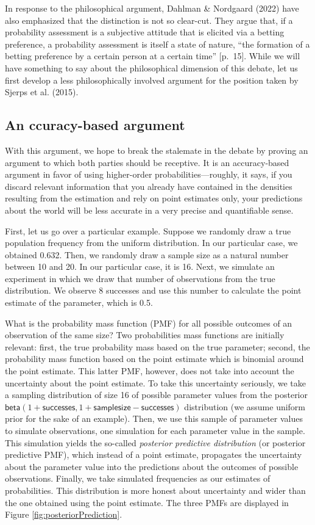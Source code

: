 \documentclass[
  10pt,
  dvipsnames,enabledeprecatedfontcommands]{scrartcl}
\newcommand{\s}[1]{\mbox{$\mathsf{#1}$}}
\begin{document}
In response to the philosophical argument, Dahlman \& Nordgaard (2022)
have also emphasized that the distinction is not so clear-cut. They
argue that, if a probability assessment is a subjective attitude that is
elicited via a betting preference, a probability assessment is itself a
state of nature, ``the formation of a betting preference by a certain
person at a certain time'' {[}p.~15{]}. While we will have something to
say about the philosophical dimension of this debate, let us first
develop a less philosophically involved argument for the position taken
by Sjerps et al. (2015).

\hypertarget{an-ccuracy-based-argument}{%
\subsection{An ccuracy-based argument}\label{an-ccuracy-based-argument}}

With this argument, we hope to break the stalemate in the debate by
proving an argument to which both parties should be receptive. It is an
accuracy-based argument in favor of using higher-order
probabilities---roughly, it says, if you discard relevant information
that you already have contained in the densities resulting from the
estimation and rely on point estimates only, your predictions about the
world will be less accurate in a very precise and quantifiable sense.

First, let us go over a particular example. Suppose we randomly draw a
true population frequency from the uniform distribution. In our
particular case, we obtained 0.632. Then, we randomly draw a sample size
as a natural number between 10 and 20. In our particular case, it is 16.
Next, we simulate an experiment in which we draw that number of
observations from the true distribution. We observe 8 successes and use
this number to calculate the point estimate of the parameter, which is
0.5.

What is the probability mass function (PMF) for all possible outcomes of
an observation of the same size? Two probabilities mass functions are
initially relevant: first, the true probability mass based on the true
parameter; second, the probability mass function based on the point
estimate which is binomial around the point estimate. This latter PMF,
however, does not take into account the uncertainty about the point
estimate. To take this uncertainty seriously, we take a sampling
distribution of size 16 of possible parameter values from the posterior
\(\s{beta}(1+\s{successes}, 1+\s{sample size} - \s{successes})\)
distribution (we assume uniform prior for the sake of an example). Then,
we use this sample of parameter values to simulate observations, one
simulation for each parameter value in the sample. This simulation
yields the so-called \emph{posterior predictive distribution} (or
posterior predictive PMF), which instead of a point estimate, propagates
the uncertainty about the parameter value into the predictions about the
outcomes of possible observations. Finally, we take simulated
frequencies as our estimates of probabilities. This distribution is more
honest about uncertainty and wider than the one obtained using the point
estimate. The three PMFs are displayed in Figure
\ref{fig:posteriorPrediction}.
\end{document}
